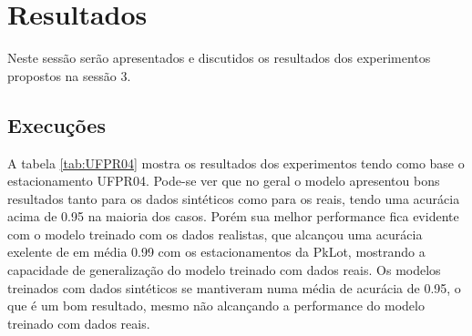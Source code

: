 \chapter{Resultados}


Neste sessão serão apresentados e discutidos os resultados dos experimentos propostos na sessão 3.

\section{Execuções}

A tabela \ref{tab:UFPR04} mostra os resultados dos experimentos tendo como base o estacionamento UFPR04. Pode-se ver que no geral o modelo apresentou bons resultados tanto para os dados sintéticos como para os reais, tendo uma acurácia acima de 0.95 na maioria dos casos. Porém sua melhor performance fica evidente com o modelo treinado com os dados realistas, que alcançou uma acurácia exelente de em média 0.99 com os estacionamentos da PkLot, mostrando a capacidade de generalização do modelo treinado com dados reais. Os modelos treinados com dados sintéticos se mantiveram numa média de acurácia de 0.95, o que é um bom resultado, mesmo não alcançando a performance do modelo treinado com dados reais.

